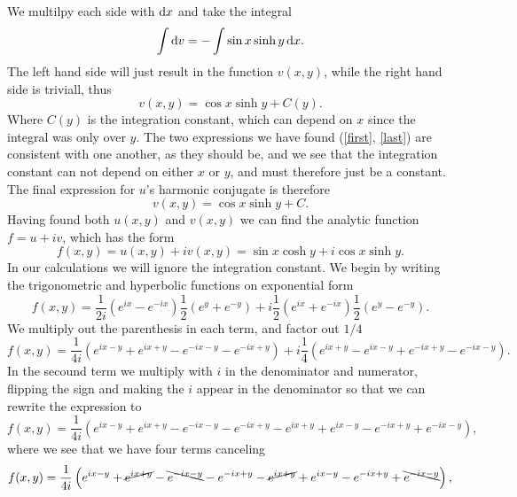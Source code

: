 \documentclass[12pt,twoside]{article}
\begin{document}
We multilpy each side with $\dif x$ and take the integral
\begin{equation}
  \int \dif v = - \int \sin{x}\sinh{y} \dif x.
\end{equation}
The left hand side will just result in the function $v(x, y)$, while the right hand side is triviall, thus
\begin{equation}
  v(x, y) = \cos{x}\sinh{y} + C(y). \label{last}
\end{equation}
Where $C(y)$ is the integration constant, which can depend on $x$ since the integral was only over $y$. The two expressions we have found (\ref{first}, \ref{last}) are consistent with one another, as they should be, and we see that the integration constant can not depend on either $x$ or $y$, and must therefore just be a constant. The final expression for $u$'s harmonic conjugate is therefore
\begin{equation}
  v(x, y) = \cos{x}\sinh{y} + C. \label{v}
\end{equation}
Having found both $u(x,y)$ and $v(x,y)$ we can find the analytic function $f=u+iv$, which has the form
\begin{equation}
  f(x, y) = u(x, y) + iv(x, y) = \sin{x}\cosh{y} + i\cos{x}\sinh{y}.
\end{equation}
In our calculations we will ignore the integration constant. We begin by writing the trigonometric and hyperbolic functions on exponential form
\begin{equation}
  f(x, y) = \frac{1}{2i}\left(e^{ix}-e^{-ix}\right)\frac{1}{2}\left(e^{y}+e^{-y}\right) + i\frac{1}{2}\left(e^{ix}+e^{-ix}\right)\frac{1}{2}\left(e^{y}-e^{-y}\right).
\end{equation}
We multiply out the parenthesis in each term, and factor out $1/4$
\begin{equation}
  f(x, y) = \frac{1}{4i}\left(e^{ix-y}+e^{ix+y}-e^{-ix-y}-e^{-ix+y}\right) + i\frac{1}{4}\left(e^{ix+y}-e^{ix-y}+e^{-ix+y}-e^{-ix-y}\right).
\end{equation}
In the secound term we multiply with $i$ in the denominator and numerator, flipping the sign and making the $i$ appear in the denominator so that we can rewrite the expression to
\begin{equation}
  f(x, y) = \frac{1}{4i}\left(e^{ix-y}+e^{ix+y}-e^{-ix-y}-e^{-ix+y} - e^{ix+y}+ e^{ix-y}-e^{-ix+y}+e^{-ix-y}\right),
\end{equation}
where we see that we have four terms canceling
\begin{equation}
  f(x, y) = \frac{1}{4i}\left(e^{ix-y}+\cancel{e^{ix+y}}-\bcancel{e^{-ix-y}}-e^{-ix+y} - \cancel{e^{ix+y}}+ e^{ix-y}-e^{-ix+y}+\bcancel{e^{-ix-y}}\right),
\end{equation}
\end{document}
